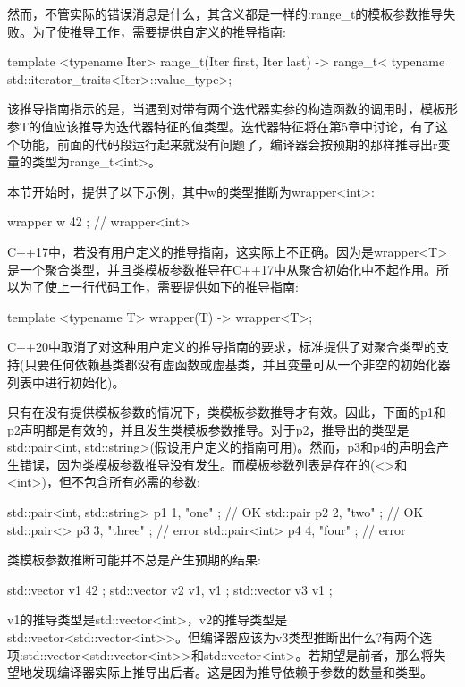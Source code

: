 然而，不管实际的错误消息是什么，其含义都是一样的:range\_t的模板参数推导失败。为了使推导工作，需要提供自定义的推导指南:

\begin{cpp}
template <typename Iter>
range_t(Iter first, Iter last) ->
range_t<
typename std::iterator_traits<Iter>::value_type>;
\end{cpp}

该推导指南指示的是，当遇到对带有两个迭代器实参的构造函数的调用时，模板形参T的值应该推导为迭代器特征的值类型。迭代器特征将在第5章中讨论，有了这个功能，前面的代码段运行起来就没有问题了，编译器会按预期的那样推导出r变量的类型为range\_t<int>。

本节开始时，提供了以下示例，其中w的类型推断为wrapper<int>:

\begin{cpp}
wrapper w{ 42 }; // wrapper<int>
\end{cpp}

C++17中，若没有用户定义的推导指南，这实际上不正确。因为是wrapper<T>是一个聚合类型，并且类模板参数推导在C++17中从聚合初始化中不起作用。所以为了使上一行代码工作，需要提供如下的推导指南:

\begin{cpp}
template <typename T>
wrapper(T) -> wrapper<T>;
\end{cpp}

C++20中取消了对这种用户定义的推导指南的要求，标准提供了对聚合类型的支持(只要任何依赖基类都没有虚函数或虚基类，并且变量可从一个非空的初始化器列表中进行初始化)。

只有在没有提供模板参数的情况下，类模板参数推导才有效。因此，下面的p1和p2声明都是有效的，并且发生类模板参数推导。对于p2，推导出的类型是std::pair<int, std::string>(假设用户定义的指南可用)。然而，p3和p4的声明会产生错误，因为类模板参数推导没有发生。而模板参数列表是存在的(<>和<int>)，但不包含所有必需的参数:

\begin{cpp}
std::pair<int, std::string> p1{ 1, "one" }; // OK
std::pair p2{ 2, "two" }; // OK
std::pair<> p3{ 3, "three" }; // error
std::pair<int> p4{ 4, "four" }; // error
\end{cpp}

类模板参数推断可能并不总是产生预期的结果:

\begin{cpp}
std::vector v1{ 42 };
std::vector v2{ v1, v1 };
std::vector v3{ v1 };
\end{cpp}

v1的推导类型是std::vector<int>，v2的推导类型是std::vector<std::vector<int>{}>。但编译器应该为v3类型推断出什么?有两个选项:std::vector<std::vector<int>{}>和std::vector<int>。若期望是前者，那么将失望地发现编译器实际上推导出后者。这是因为推导依赖于参数的数量和类型。

